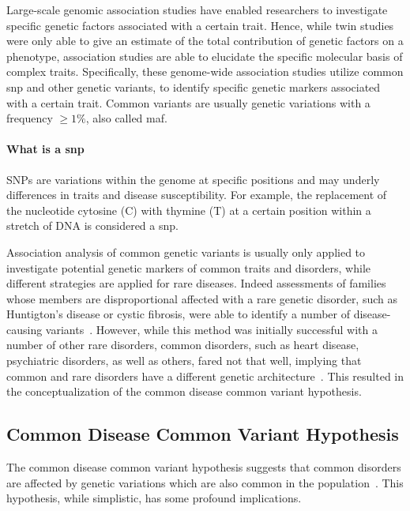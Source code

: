 Large-scale genomic association studies have enabled researchers to investigate specific genetic factors associated with a certain trait.
Hence, while twin studies were only able to give an estimate of the total contribution of genetic factors on a phenotype, association studies are able to elucidate the specific molecular basis of complex traits.
Specifically, these genome-wide association studies utilize common \acrfull{snp} and other genetic variants, to identify specific genetic markers associated with a certain trait.
Common variants are usually genetic variations with a frequency $\ge 1\%$, also called \acrfull{maf}.

\paragraph{What is a \acrfull{snp}}
\label{par:what_are_snp}
SNPs are variations within the genome at  specific positions and may underly differences in traits and disease susceptibility. 
For example, the replacement of the nucleotide cytosine (C) with thymine (T) at a certain position within a stretch of DNA is considered a \acrfull{snp}.

Association analysis of common genetic variants is usually only applied to investigate potential genetic markers of common traits and disorders, while different strategies are applied for rare diseases.
Indeed assessments of families whose members are disproportional affected with a rare genetic disorder, such as Huntigton's disease or cystic fibrosis, were able to identify a number of disease-causing variants~\cite{Kerem1989}.
However, while this method was initially successful with a number of other rare disorders, common disorders, such as heart disease, psychiatric disorders, as well as others, fared not that well,  
implying that common and rare disorders have a different genetic architecture~\cite{Hirschhorn2005a}.
This resulted in the conceptualization of the common disease common variant hypothesis.


\subsection{Common Disease Common Variant Hypothesis}
\label{sub:common_versus_rare_genetic_variants}

The common disease common variant hypothesis suggests that common disorders are affected by genetic variations which are also common in the population~\cite{Schork2010}.
This hypothesis, while simplistic, has some profound implications.

